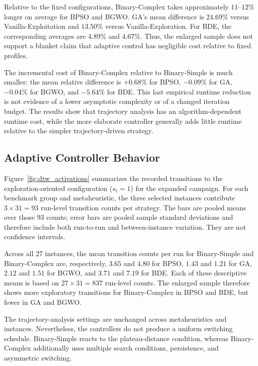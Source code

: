 \documentclass[mathematics,article,accept,moreauthors]{Definitions/mdpi}
\begin{document}
Relative to the fixed configurations, Binary-Complex takes approximately
$11$--$12\%$ longer on average for BPSO and BGWO. GA's mean difference
is $24.69\%$ versus Vanilla-Exploitation and $13.50\%$ versus
Vanilla-Exploration. For BDE, the corresponding averages are $4.89\%$
and $4.67\%$. Thus, the enlarged sample does not support a blanket claim
that adaptive control has negligible cost relative to fixed profiles.

The incremental cost of Binary-Complex relative to Binary-Simple is much
smaller: the mean relative difference is $+0.68\%$ for BPSO, $-0.09\%$
for GA, $-0.04\%$ for BGWO, and $-5.64\%$ for BDE.
This last empirical runtime reduction is not evidence of a lower
asymptotic complexity or of a changed iteration budget. The results show
that trajectory analysis has an algorithm-dependent runtime cost, while
the more elaborate controller generally adds little runtime relative to
the simpler trajectory-driven strategy.

\subsection{Adaptive Controller Behavior}
\label{subsec:controller_behavior}

Figure~\ref{fig:dtw_activations} summarizes the recorded transitions to
the exploration-oriented configuration ($s_t=1$) for the expanded campaign.
For each benchmark group and metaheuristic, the three selected instances
contribute $3\times31=93$ run-level transition counts per strategy.
The bars are pooled means over those 93 counts; error bars are pooled
sample standard deviations and therefore include both run-to-run and
between-instance variation. They are not confidence intervals.


Across all 27 instances, the mean transition counts per run for
Binary-Simple and Binary-Complex are, respectively, $3.65$ and $4.80$
for BPSO, $1.43$ and $1.21$ for GA, $2.12$ and $1.51$ for BGWO,
and $3.71$ and $7.19$ for BDE. Each of these descriptive means is based
on $27\times31=837$ run-level counts. The enlarged sample therefore
shows more exploratory transitions for Binary-Complex in BPSO and BDE,
but fewer in GA and BGWO.

The trajectory-analysis settings are unchanged across metaheuristics and
instances. Nevertheless, the controllers do not produce a uniform
switching schedule. Binary-Simple reacts to the plateau-distance condition,
whereas Binary-Complex additionally uses multiple search conditions,
persistence, and asymmetric switching.
\end{document}
